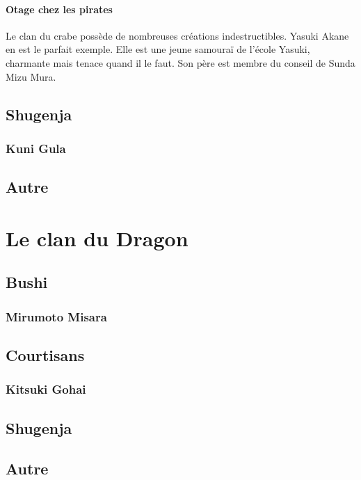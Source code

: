 \documentclass[10pt,a4paper]{book}
\begin{document}
\subsubsection*{Otage chez les pirates}

Le clan du crabe possède de nombreuses créations indestructibles. Yasuki Akane en est le parfait exemple.
Elle est une jeune samouraï de l'école Yasuki, charmante mais tenace quand il le faut. Son père est membre du conseil de Sunda Mizu Mura.

\section{Shugenja}

\subsection{Kuni Gula}

\section{Autre}

\chapter{Le clan du Dragon}

\section{Bushi}

\subsection{Mirumoto Misara}

\section{Courtisans}

\subsection{Kitsuki Gohai}

\section{Shugenja}

\section{Autre}
\end{document}
